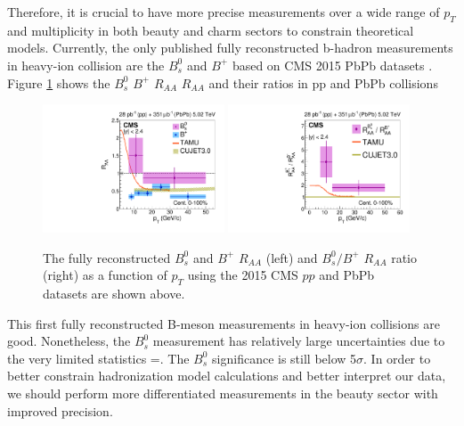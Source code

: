 
\clearpage

Therefore, it is crucial to have more precise measurements over a wide range of $p_T$ and multiplicity in both beauty and charm sectors to constrain theoretical models. Currently, the only published fully reconstructed b-hadron measurements in heavy-ion collision are the $B^0_s$ and $B^+$ based on CMS 2015 PbPb datasets \cite{CMSBsBP2015}. Figure \ref{BsBP2015} shows the $B^0_s$ $B^+$ $R_{AA}$ $R_{AA}$ and their ratios in pp and PbPb collisions

\begin{figure}[hbtp]
\begin{center}
\includegraphics[width=0.48\textwidth]{Figures/Chapter2/CMSBsBPRAA2015.pdf}
\includegraphics[width=0.48\textwidth]{Figures/Chapter2/CMSBsBP2015.pdf}
\caption{The fully reconstructed $B^0_s$ and $B^+$ $R_{AA}$ (left) and $B^0_s/B^+$ $R_{AA}$ ratio (right) as a function of $p_T$ using the 2015 CMS $pp$ and PbPb datasets are shown above.}
\label{BsBP2015}
\end{center}
\end{figure}   


This first fully reconstructed B-meson measurements in heavy-ion collisions are good. Nonetheless, the $B^0_s$ measurement has relatively large uncertainties due to the very limited statistics =. The $B^0_s$ significance is still below 5$\sigma$. In order to better constrain hadronization model calculations and better interpret our data, we should perform more differentiated measurements in the beauty sector with improved precision. 

